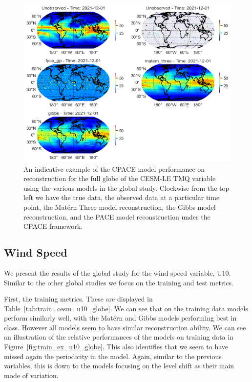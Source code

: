 \begin{figure}
	\centering
	\includegraphics[width=\textwidth]{full_ex_tmq_globe}
	\caption{An indicative example of the CPACE model performance on reconstruction for the full globe of the CESM-LE TMQ variable using the various models in the global study. Clockwise from the top left we have the true data, the observed data at a particular time point, the Mat\'ern Three model reconstruction, the Gibbs model reconstruction, and the PACE model reconstruction under the CPACE framework.}
	\label{fig:full_ex_tmq_globe}
\end{figure}


\subsection{Wind Speed\label{ssec:cesm_u10}}
We present the results of the global study for the wind speed variable, U10.
Similar to the other global studies we focus on the training and test metrics.

First, the training metrics.
These are displayed in Table~\ref{tab:train_cesm_u10_globe}.
We can see that on the training data models perform similarly well, with the Mat\'ern and Gibbs models performing best in class.
However all models seem to have similar reconstruction ability.
We can see an illustration of the relative performances of the models on training data in Figure~\ref{fig:train_ex_u10_globe}.
This also identifies that we seem to have missed again the periodicity in the model.
Again, similar to the previous variables, this is down to the models focusing on the level shift as their main mode of variation.

